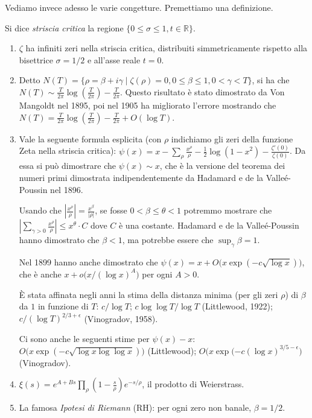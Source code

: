 Vediamo invece adesso le varie congetture. Premettiamo una definizione.
\begin{defn}
  Si dice \textit{striscia critica} la regione $\{0 \le \sigma \le 1, t \in \mathbb{R}\}$.
\end{defn}
\begin{enumerate}
  \item $\zeta$ ha infiniti zeri nella striscia critica, distribuiti simmetricamente rispetto alla bisettrice $\sigma=1/2$ e all'asse reale $t=0$.
  \item Detto $N(T)=\{\rho=\beta+i\gamma \mid \zeta(\rho)=0, 0 \le \beta \le 1, 0<\gamma<T\}$, si ha che $N(T) \sim \frac{T}{2\pi}\log\left(\frac{T}{2\pi}\right)-\frac{T}{2\pi}$. Questo risultato è stato dimostrato da Von Mangoldt nel 1895, poi nel 1905 ha migliorato l'errore mostrando che $N(T)=\frac{T}{2\pi}\log\left(\frac{T}{2\pi}\right)-\frac{T}{2\pi}+O(\log{T})$.
  \item Vale la seguente formula esplicita (con $\rho$ indichiamo gli zeri della funzione Zeta nella striscia critica): $\displaystyle \psi(x)=x-\sum_{\rho} \frac{x^{\rho}}{\rho}-\frac{1}{2}\log(1-x^2)-\frac{\zeta'(0)}{\zeta(0)}$. Da essa si può dimostrare che $\psi(x) \sim x$, che è la versione del teorema dei numeri primi dimostrata indipendentemente da Hadamard e de la Valleé-Poussin nel 1896.

  Usando che $\left|\frac{x^{\rho}}{\rho}\right|=\frac{x^{\beta}}{|\rho|}$, se fosse $0<\beta \le \theta<1$ potremmo mostrare che $\displaystyle \left|\sum_{\gamma>0}\frac{x^{\rho}}{\rho}\right| \le x^{\theta}\cdot C$ dove $C$ è una costante.
  Hadamard e de la Valleé-Poussin hanno dimostrato che $\beta<1$, ma potrebbe essere che $\sup_{\gamma} \beta=1$.

  Nel 1899 hanno anche dimostrato che $\psi(x)=x+O\bigl(x\exp(-c\sqrt{\log{x}})\bigr)$, che è anche $x+o\bigl(x/(\log{x})^A\bigr)$ per ogni $A>0$.

  È stata affinata negli anni la stima della distanza minima (per gli zeri $\rho$) di $\beta$ da $1$ in funzione di $T$: $c/\log{T}$; $c\log\log{T}/\log{T}$ (Littlewood, 1922); $c/(\log{T})^{2/3+\epsilon}$ (Vinogradov, 1958).

  Ci sono anche le seguenti stime per $\psi(x)-x$: $O\bigl(x\exp(-c\sqrt{\log{x}\log\log{x}})\bigr)$ (Littlewood); $O\bigl(x\exp(-c(\log{x})^{3/5-\epsilon}\bigr)$ (Vinogradov).
  \item $\displaystyle \xi(s)=e^{A+Bs}\prod_{\rho}\left(1-\frac{s}{\rho}\right)e^{-s/\rho}$, il prodotto di Weierstrass.
  \item La famosa \textit{Ipotesi di Riemann} (RH): per ogni zero non banale, $\beta=1/2$.
\end{enumerate}
